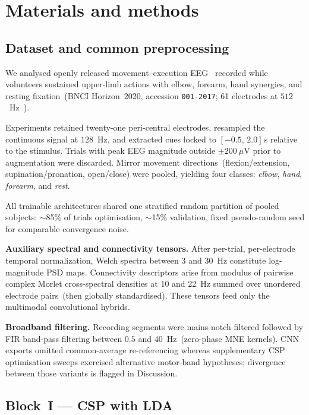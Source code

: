 \section{Materials and methods}
\label{sec:methods}

\subsection{Dataset and common preprocessing}
\label{sec:dataprep}

We analysed openly released movement--execution EEG~\cite{ofner2017upper} recorded while volunteers sustained upper-limb actions with elbow, forearm, hand synergies, and resting fixation~(BNCI Horizon~2020, accession \texttt{001-2017}; 61 electrodes at \(512\)~Hz~\cite{ofner2017upper}).

Experiments retained twenty-one peri-central electrodes, resampled the continuous signal at \(128\)~Hz, and extracted cues locked to \([-0.5,\,2.0]\)\,s relative to the stimulus.
Trials with peak EEG magnitude outside \(\pm 200~\mu\text{V}\) prior to augmentation were discarded.
Mirror movement directions~(flexion/extension, supination/pronation, open/close) were pooled, yielding four classes: \emph{elbow}, \emph{hand}, \emph{forearm}, and \emph{rest}.

All trainable architectures shared one stratified random partition of pooled subjects: \(\sim\)85\% of trials optimisation, \(\sim\)15\% validation, fixed pseudo-random seed for comparable convergence noise.

\textbf{Auxiliary spectral and connectivity tensors.}
After per-trial, per-electrode temporal normalization, Welch spectra between 3 and 30~Hz constitute log-magnitude PSD maps.
Connectivity descriptors arise from modulus of pairwise complex Morlet cross-spectral densities at 10 and 22~Hz summed over unordered electrode pairs~(then globally standardised).
These tensors feed only the multimodal convolutional hybrids.

\textbf{Broadband filtering.}
Recording segments were mains-notch filtered followed by FIR band-pass filtering between \(0.5\) and \(40\)~Hz~(zero-phase MNE kernels).
CNN exports omitted common-average re-referencing whereas supplementary CSP optimisation sweeps exercised alternative motor-band hypotheses; divergence between those variants is flagged in Discussion.

\subsection{Block~I --- CSP with LDA}
\label{sec:block1}

